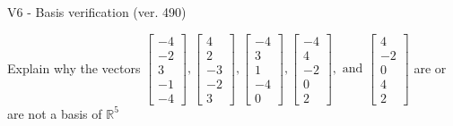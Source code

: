 \begin{exercise}
  \begin{exerciseTitle}V6 - Basis verification (ver. 490)\end{exerciseTitle}
  \begin{exerciseStatement}
    Explain why the vectors \(\left[\begin{array}{r}
-4 \\
-2 \\
3 \\
-1 \\
-4
\end{array}\right] , \left[\begin{array}{r}
4 \\
2 \\
-3 \\
-2 \\
3
\end{array}\right] , \left[\begin{array}{r}
-4 \\
3 \\
1 \\
-4 \\
0
\end{array}\right] , \left[\begin{array}{r}
-4 \\
4 \\
-2 \\
0 \\
2
\end{array}\right] , \text{ and } \left[\begin{array}{r}
4 \\
-2 \\
0 \\
4 \\
2
\end{array}\right]\) are or are not a basis of \(\mathbb{R}^5\)	



\end{exerciseStatement}
\end{exercise}
